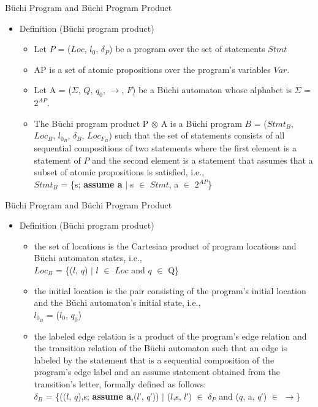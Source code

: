 \documentclass[12pt]{beamer}
\begin{document}
\begin{frame}{B\"uchi Program and B\"uchi Program Product}
  	\begin{itemize}
		\item Definition (B\"uchi program product)
		\begin{itemize}
			\item Let $P$ = ($Loc$, $l_{0}$, $\delta_{P}$) be a program over the set of statements $Stmt$
			\item AP is a set of atomic propositions over the program’s variables $Var$.
			\item Let A = ($\Sigma$, $Q$, $q_{0}$, $\rightarrow$, $F$) be a B\"uchi automaton whose alphabet is $\Sigma$ = $2^{AP}$.
			\item The B\"uchi program product P $\otimes$ A is a B\"uchi program $B$ = ($Stmt_{B}$, $Loc_{B}$, $l_{{0}_{B}}$, $\delta_{B}$, $Loc_{{F}_{B}}$) such that the set of statements consists of all sequential compositions of two statements where the first element is a statement of $P$ and the second element is a statement that assumes that a subset of atomic propositions is satisfied, i.e.,\\
			$Stmt_{B}$ = \{s; \textbf{assume a} $\mid$ s $\in$ $Stmt$, a $\in$ $2^{AP}$\}

		\end{itemize}
  	\end{itemize}
\end{frame}

\begin{frame}{B\"uchi Program and B\"uchi Program Product}
  	\begin{itemize}
		\item Definition (B\"uchi program product)
		\begin{itemize}
			\item the set of locations is the Cartesian product of program locations and B\"uchi automaton states, i.e.,\\
			$Loc_{B}$ = \{($l$, $q$) $\mid$ $l$ $\in$ $Loc$ and $q$ $\in$ Q\}
			\item the initial location is the pair consisting of the program’s initial location and the B\"uchi automaton’s initial state, i.e.,\\
			$l_{{0}_{B}}$ = ($l_{0}$, $q_{0}$)
			\item the labeled edge relation is a product of the program’s edge relation and the transition relation of the B\"uchi automaton such that an edge is labeled by the statement that is a sequential composition of the program’s edge label and an assume statement obtained from the transition’s letter, formally defined as follows:\\
			 $\delta_{B}$ = \{(($l$, $q$),s; \textbf{assume a},($l$′, $q$′)) $\mid$ ($l$,s, $l$′) $\in$ $\delta_{P}$ and ($q$, a, $q$′) $\in$ $\rightarrow$\}
		\end{itemize}
  	\end{itemize}
\end{frame}
\end{document}
